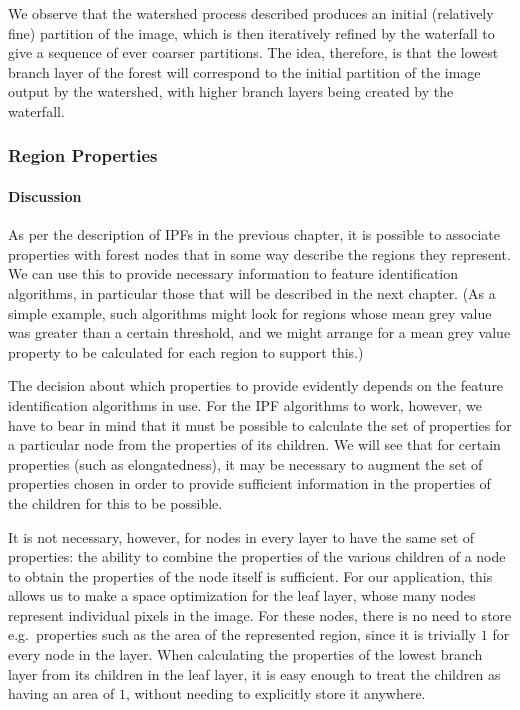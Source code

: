 
We observe that the watershed process described produces an initial (relatively fine) partition of the image, which is then iteratively refined by the waterfall to give a sequence of ever coarser partitions. The idea, therefore, is that the lowest branch layer of the forest will correspond to the initial partition of the image output by the watershed, with higher branch layers being created by the waterfall.

\subsubsection{Region Properties}

\paragraph{Discussion}

As per the description of IPFs in the previous chapter, it is possible to associate properties with forest nodes that in some way describe the regions they represent. We can use this to provide necessary information to feature identification algorithms, in particular those that will be described in the next chapter. (As a simple example, such algorithms might look for regions whose mean grey value was greater than a certain threshold, and we might arrange for a mean grey value property to be calculated for each region to support this.)

The decision about which properties to provide evidently depends on the feature identification algorithms in use. For the IPF algorithms to work, however, we have to bear in mind that it must be possible to calculate the set of properties for a particular node from the properties of its children. We will see that for certain properties (such as elongatedness), it may be necessary to augment the set of properties chosen in order to provide sufficient information in the properties of the children for this to be possible.

It is not necessary, however, for nodes in every layer to have the same set of properties: the ability to combine the properties of the various children of a node to obtain the properties of the node itself is sufficient. For our application, this allows us to make a space optimization for the leaf layer, whose many nodes represent individual pixels in the image. For these nodes, there is no need to store e.g.~properties such as the area of the represented region, since it is trivially $1$ for every node in the layer. When calculating the properties of the lowest branch layer from its children in the leaf layer, it is easy enough to treat the children as having an area of $1$, without needing to explicitly store it anywhere.

